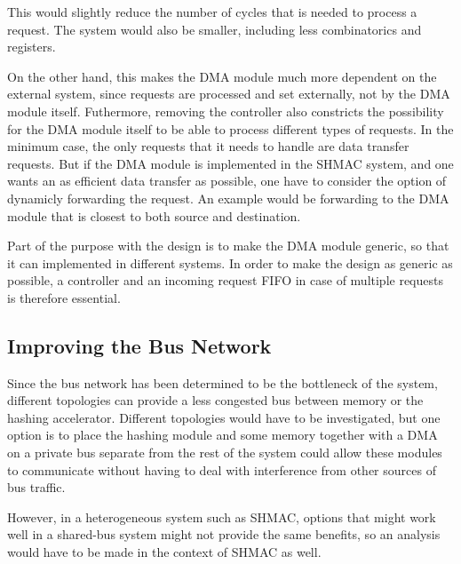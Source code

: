 This would slightly reduce the number of cycles that is needed to process a request.
The system would also be smaller, including less combinatorics and registers.

On the other hand, this makes the DMA module much more dependent on the external system, since requests are processed and set externally, not by the DMA module itself.
Futhermore, removing the controller also constricts the possibility for the DMA module itself to be able to process different types of requests.
In the minimum case, the only requests that it needs to handle are data transfer requests.
But if the DMA module is implemented in the SHMAC system, and one wants an as efficient data transfer as possible, one have to consider the option of dynamicly forwarding the request.
An example would be forwarding to the DMA module that is  closest to both source and destination.

Part of the purpose with the design is to make the DMA module generic, so that it can implemented in different systems.
In order to make the design as generic as possible, a controller and an incoming request FIFO
in case of multiple requests is therefore essential.

\subsection{Improving the Bus Network}
Since the bus network has been determined to be the bottleneck of the system, different topologies
can provide a less congested bus between memory or the hashing accelerator. Different topologies
would have to be investigated, but one option is to place the hashing module and some memory together
with a DMA on a private bus separate from the rest of the system could allow these modules to
communicate without having to deal with interference from other sources of bus traffic.

However, in a heterogeneous system such as SHMAC, options that might work well in a shared-bus
system might not provide the same benefits, so an analysis would have to be made in the context
of SHMAC as well.

